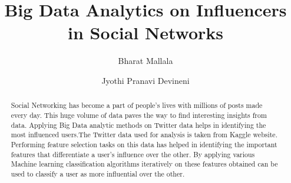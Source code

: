\documentclass[sigconf]{acmart}
\begin{document}
\title{Big Data Analytics on Influencers in Social Networks}



\author{Bharat Mallala}

\author{Jyothi Pranavi Devineni}




\begin{abstract}
Social Networking has become a part of people's lives with millions
of posts made every day. This huge volume of data paves the way to find interesting insights from data. Applying Big Data analytic methods on Twitter data helps in identifying the most influenced users.The Twitter data used for analysis is taken from Kaggle website. Performing feature selection tasks on this data has helped in identifying the important features that differentiate a user's influence over the other. By applying various Machine learning classification algorithms iteratively on these features obtained can be used to classify a user as more influential over the other. 

\end{abstract}

\maketitle
\end{document}
